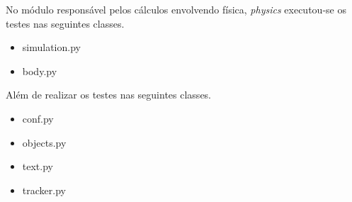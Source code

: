No módulo responsável pelos cálculos envolvendo física, \textit{physics} executou-se os testes nas seguintes classes.
\begin{itemize}
\item simulation.py
\item body.py
\end{itemize}

Além de realizar os testes nas seguintes classes.
\begin{itemize}
\item conf.py
\item objects.py
\item text.py
\item tracker.py
\end{itemize}
